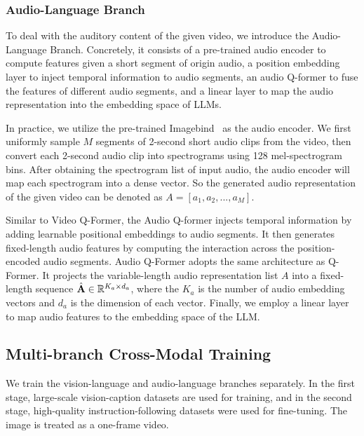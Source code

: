 \documentclass[11pt]{article}
\begin{document}
\subsubsection{Audio-Language Branch}
To deal with the auditory content of the given video, we introduce the Audio-Language Branch. Concretely, it consists of a pre-trained audio encoder to compute features given a short segment of origin audio, a position embedding layer to inject temporal information to audio segments, an audio Q-former to fuse the features of different audio segments, and a linear layer to map the audio representation into the embedding space of LLMs.

In practice, we utilize the pre-trained Imagebind~\citep{girdhar2023imagebind} as the audio encoder. We first uniformly sample $M$ segments of 2-second short audio clips from the video, then convert each 2-second audio clip into spectrograms using 128 mel-spectrogram bins. After obtaining the spectrogram list of input audio, the audio encoder will map each spectrogram into a dense vector. So the generated audio representation of the given video can be denoted as  $A = [a_1,a_2,...,a_M]$. 

Similar to Video Q-Former, the Audio Q-former injects temporal information by adding learnable positional embeddings to audio segments. It then generates fixed-length audio features by computing the interaction across the position-encoded audio segments.  Audio Q-Former adopts the same architecture as Q-Former. It projects the variable-length audio representation list $A$ into a fixed-length sequence $\hat{\mathrm{\bf A}} \in \mathbb{R} ^ {K_a \times d_a}$, where the $K_a$ is the number of audio embedding vectors and $d_a$ is the dimension of each vector. Finally, we employ a linear layer to map audio features to the embedding space of the LLM.





\subsection{Multi-branch Cross-Modal Training}
We train the vision-language and audio-language branches separately. In the first stage, large-scale vision-caption datasets are used for training, and in the second stage, high-quality instruction-following datasets were used for fine-tuning. The image is treated as a one-frame video.
\end{document}
